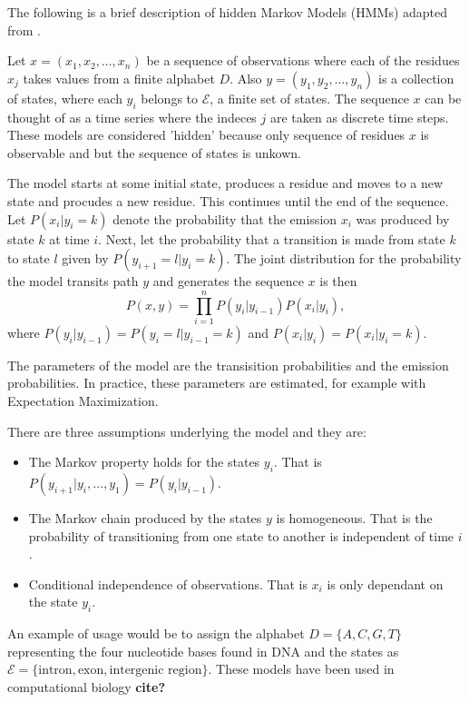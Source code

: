 The following is a brief description of hidden Markov Models (HMMs) adapted from \cite{mesa2016hidden}.

Let $x = (x_1,x_2,\ldots,x_n)$ be a sequence of observations where each of the residues $x_j$ takes values from a finite alphabet $D$. 
Also $y = (y_1,y_2,\ldots,y_n)$ is a collection of states, where each $y_i$ belongs to $\mathcal{E}$, a finite set of states. The sequence $x$ can be thought of as a time series where the indeces $j$ are taken as discrete time steps. These models are considered 'hidden' because only sequence of residues $x$ is observable and but the sequence of states is unkown.

The model starts at some initial state, produces a residue and moves to a new state and procudes a new residue. This continues until the end of the sequence. Let $P(x_i|y_i = k)$ denote the probability that the emission $x_i$ was produced by state $k$ at time $i$. Next, let the probability that a transition is made from state $k$ to state $l$ given by $P(y_{i+1} = l | y_i = k)$. The joint distribution for the probability the model transits path $y$ and generates the sequence $x$ is then
	\begin{equation}
		P(x,y) = \prod_{i=1}^{n} P(y_i|y_{i-1})P(x_i|y_i),
	\end{equation}
where $P(y_i|y_{i-1}) = P(y_{i} = l | y_{i-1} = k)$ and $P(x_i|y_i) = P(x_i|y_i = k)$. 

The parameters of the model are the transisition probabilities and the emission probabilities. In practice, these parameters are estimated, for example with Expectation Maximization.

There are three assumptions underlying the model and they are:
	\begin{itemize}
		\item The Markov property holds for the states $y_i$. That is $P(y_{i+1}|y_i,\ldots,y_1) = P(y_i|y_{i-1})$.
		\item The Markov chain produced by the states $y$ is homogeneous. That is the probability of transitioning from one state to another is independent of time $i$. 
		\item Conditional independence of observations. That is $x_i$ is only dependant on the state $y_i$. 
	\end{itemize}

An example of usage would be to assign the alphabet $D = \{A,C,G,T\}$ representing the four nucleotide bases found in DNA and the states as $\mathcal{E} = \{\text{intron}, \text{exon}, \text{intergenic region}\}$. These models have been used in computational biology \textbf{cite?}






